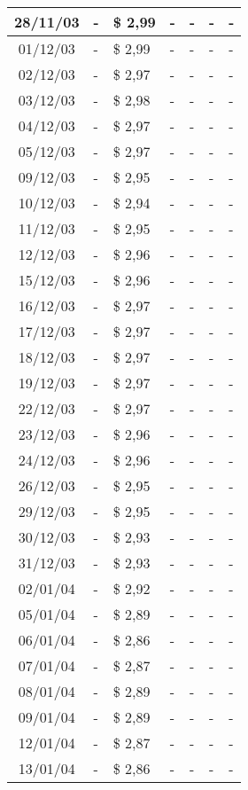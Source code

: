 \begin{center}
\begin{longtable}{|c|p{1.5cm}|p{1.5cm}|p{1.5cm}|p{1.5cm}|p{1.5cm}|p{1.5cm}|}
28/11/03 & - & \$ 2,99 & - & - & - & - \\ \hline
01/12/03 & - & \$ 2,99 & - & - & - & - \\ \hline
02/12/03 & - & \$ 2,97 & - & - & - & - \\ \hline
03/12/03 & - & \$ 2,98 & - & - & - & - \\ \hline
04/12/03 & - & \$ 2,97 & - & - & - & - \\ \hline
05/12/03 & - & \$ 2,97 & - & - & - & - \\ \hline
09/12/03 & - & \$ 2,95 & - & - & - & - \\ \hline
10/12/03 & - & \$ 2,94 & - & - & - & - \\ \hline
11/12/03 & - & \$ 2,95 & - & - & - & - \\ \hline
12/12/03 & - & \$ 2,96 & - & - & - & - \\ \hline
15/12/03 & - & \$ 2,96 & - & - & - & - \\ \hline
16/12/03 & - & \$ 2,97 & - & - & - & - \\ \hline
17/12/03 & - & \$ 2,97 & - & - & - & - \\ \hline
18/12/03 & - & \$ 2,97 & - & - & - & - \\ \hline
19/12/03 & - & \$ 2,97 & - & - & - & - \\ \hline
22/12/03 & - & \$ 2,97 & - & - & - & - \\ \hline
23/12/03 & - & \$ 2,96 & - & - & - & - \\ \hline
24/12/03 & - & \$ 2,96 & - & - & - & - \\ \hline
26/12/03 & - & \$ 2,95 & - & - & - & - \\ \hline
29/12/03 & - & \$ 2,95 & - & - & - & - \\ \hline
30/12/03 & - & \$ 2,93 & - & - & - & - \\ \hline
31/12/03 & - & \$ 2,93 & - & - & - & - \\ \hline
02/01/04 & - & \$ 2,92 & - & - & - & - \\ \hline
05/01/04 & - & \$ 2,89 & - & - & - & - \\ \hline
06/01/04 & - & \$ 2,86 & - & - & - & - \\ \hline
07/01/04 & - & \$ 2,87 & - & - & - & - \\ \hline
08/01/04 & - & \$ 2,89 & - & - & - & - \\ \hline
09/01/04 & - & \$ 2,89 & - & - & - & - \\ \hline
12/01/04 & - & \$ 2,87 & - & - & - & - \\ \hline
13/01/04 & - & \$ 2,86 & - & - & - & - \\ \hline

\end{longtable}
\end{center}

